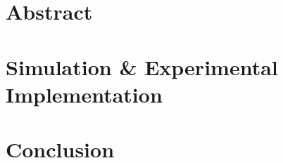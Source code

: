 \documentclass[11pt,twoside]{report}
\begin{document}

\thispagestyle{empty}



\chapter*{Abstract}

\cleardoublepage

\tableofcontents

\cleardoublepage

\cleardoublepage







%

%

%


%


\chapter{Simulation \& Experimental Implementation}

\cleardoublepage

\chapter{Conclusion}
%

%
\end{document}
